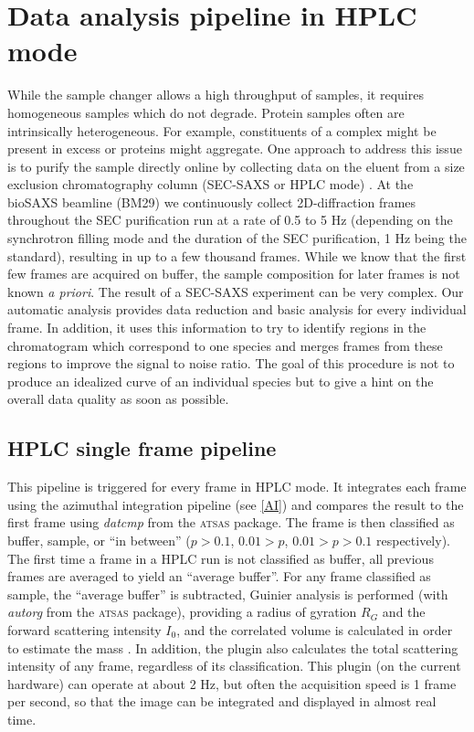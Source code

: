 \documentclass[preprint,pdf]{iucr}              %
\begin{document}
\section{Data analysis pipeline in HPLC mode}
While the sample changer allows a high throughput of samples, it requires
homogeneous samples which do not degrade.
Protein samples often are intrinsically heterogeneous.
For example, constituents of a complex might be present in excess or proteins
might aggregate.
One approach to address this issue is to purify the sample directly online by collecting data
on the eluent from a size exclusion chromatography column (SEC-SAXS or HPLC mode) \cite{SECPaper2012,SECP12,SECSWING}.
At the bioSAXS beamline (BM29) we continuously collect 2D-diffraction frames
throughout the SEC purification run at a rate of 0.5 to 5 Hz
(depending on the synchrotron filling mode and the duration of the SEC purification, 1 Hz being the standard),
resulting in up to a few thousand frames.
While we know that the first few frames are acquired on buffer, the sample composition
for later frames is not known \textit{a priori}.
The result of a SEC-SAXS experiment can be very complex.
Our automatic analysis provides data reduction and basic analysis for every
individual frame.
In addition, it uses this information to try to identify regions in the
chromatogram which correspond to one species and merges frames from these
regions to improve the signal to noise ratio.
The goal of this procedure is not to produce an idealized curve of an individual
species but to give a hint on the overall data quality as soon as possible.

\subsection{HPLC single frame pipeline}

This pipeline is triggered for every frame in HPLC mode.
It integrates each frame using the azimuthal integration pipeline (see
\ref{AI}) and compares the result to the first frame using \textit{datcmp} from the
\textsc{atsas} package.
The frame is then classified as buffer, sample, or ``in between''
($p>0.1$, $0.01 > p$, $0.01>p>0.1$  respectively).
The first time a frame in a HPLC run is not classified as buffer, all previous
frames are averaged to yield an ``average buffer''.
For any frame classified as sample, the ``average buffer'' is subtracted, Guinier
analysis is performed (with \textit{autorg} from the \textsc{atsas} package),
providing a radius of gyration $R_G$ and the forward scattering intensity $I_0$,
and the correlated volume is calculated in order to estimate the mass
\cite{RamboTainerNature2013}.
In addition, the plugin also calculates the total scattering intensity of any
frame, regardless of its classification.
This plugin (on the current hardware) can operate at about 2 Hz, but often the
acquisition speed is 1 frame per second, so that the image can be integrated and
displayed in almost real time.
\end{document}
